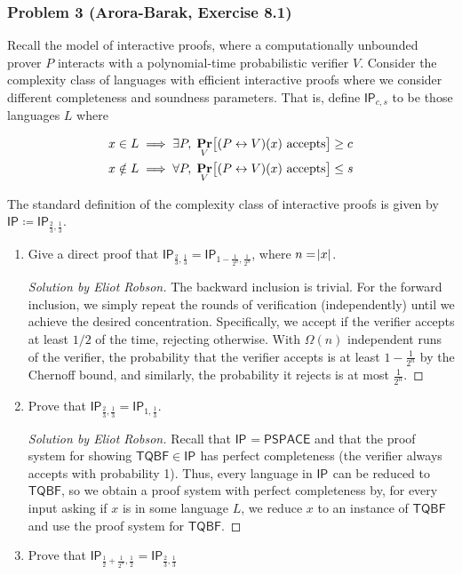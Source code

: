 \documentclass{article}
\newenvironment{solution}[1]{\begin{proof}[Solution by #1]}{\end{proof}}
\newcommand{\PSPACE}{\mathsf{PSPACE}}
\newcommand{\TQBF}{\mathsf{TQBF}}
\newcommand{\IP}[1]{\mathsf{IP}_{#1}}
\begin{document}
\subsubsection{Problem 3 (Arora-Barak, Exercise 8.1)}
Recall the model of interactive proofs, where a computationally unbounded prover \(P\) interacts with a polynomial-time probabilistic verifier \(V\). Consider the complexity class of languages with efficient interactive proofs where we consider different completeness and soundness parameters. That is, define \(\IP{c,s}\) to be those languages \(L\) where

\begin{align*}
    x \in L
    &\implies
    \exists P, \; \Prob{(P \leftrightarrow V)(x) \text{ accepts}}[V] \geq c\\
    x \notin L
    &\implies
    \forall P, \; \Prob{(P \leftrightarrow V)(x) \text{ accepts}}[V] \leq s
\end{align*}

The standard definition of the complexity class of interactive proofs is given by \(\IP{} \coloneqq \IP{\frac{2}{3}, \frac{1}{3}}\).

\begin{enumerate}
    \item Give a direct proof that \(\IP{\frac{2}{3}, \frac{1}{3}} = \IP{1 - \frac{1}{2^n}, \frac{1}{2^n}}\), where \(n = \abs{x}\).
    
    \begin{solution}{Eliot Robson}
        The backward inclusion is trivial. For the forward inclusion, we simply repeat the rounds of verification (independently) until we achieve the desired concentration. Specifically, we accept if the verifier accepts at least \(1/2\) of the time, rejecting otherwise. With \(\Omega(n)\) independent runs of the verifier, the probability that the verifier accepts is at least \(1 - \frac{1}{2^n}\) by the Chernoff bound, and similarly, the probability it rejects is at most \(\frac{1}{2^n}\).
    \end{solution}
    
    \item Prove that \(\IP{\frac{2}{3}, \frac{1}{3}} = \IP{1, \frac{1}{3}}\).
    
    \begin{solution}{Eliot Robson}
        Recall that \(\IP{} = \PSPACE\) and that the proof system for showing \(\TQBF \in \IP{}\)  has perfect completeness (the verifier always accepts with probability 1). Thus, every language in \(\IP{}\) can be reduced to \(\TQBF\), so we obtain a proof system with perfect completeness by, for every input asking if \(x\) is in some language \(L\), we reduce \(x\) to an instance of \(\TQBF\) and use the proof system for \(\TQBF\).
    \end{solution}
    
    \item Prove that \(\IP{\frac{1}{2} + \frac{1}{2^n}, \frac{1}{2}} = \IP{\frac{2}{3}, \frac{1}{3}}\)
\end{enumerate}
\end{document}
